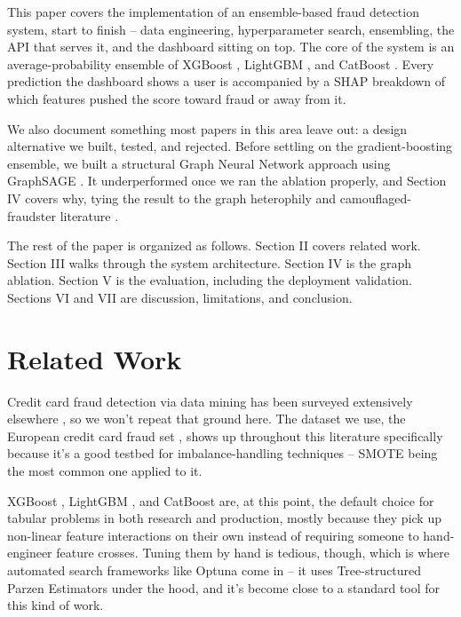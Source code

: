 \documentclass[conference]{IEEEtran}
\begin{document}
This paper covers the implementation of an ensemble-based fraud detection system, start to finish -- data engineering, hyperparameter search, ensembling, the API that serves it, and the dashboard sitting on top. The core of the system is an average-probability ensemble of XGBoost \cite{chen2016xgboost}, LightGBM \cite{ke2017lightgbm}, and CatBoost \cite{prokhorenkova2018catboost}. Every prediction the dashboard shows a user is accompanied by a SHAP \cite{lundberg2017unified} breakdown of which features pushed the score toward fraud or away from it.

We also document something most papers in this area leave out: a design alternative we built, tested, and rejected. Before settling on the gradient-boosting ensemble, we built a structural Graph Neural Network approach using GraphSAGE \cite{hamilton2017inductive}. It underperformed once we ran the ablation properly, and Section IV covers why, tying the result to the graph heterophily and camouflaged-fraudster literature \cite{zhu2020beyond, dou2020enhancing}.

The rest of the paper is organized as follows. Section II covers related work. Section III walks through the system architecture. Section IV is the graph ablation. Section V is the evaluation, including the deployment validation. Sections VI and VII are discussion, limitations, and conclusion.

\section{Related Work}
Credit card fraud detection via data mining has been surveyed extensively elsewhere \cite{abdallah2016fraud, phua2010comprehensive}, so we won't repeat that ground here. The dataset we use, the European credit card fraud set \cite{dalpozzolo2015calibrating}, shows up throughout this literature specifically because it's a good testbed for imbalance-handling techniques -- SMOTE \cite{macia2011smote} being the most common one applied to it.

XGBoost \cite{chen2016xgboost}, LightGBM \cite{ke2017lightgbm}, and CatBoost \cite{prokhorenkova2018catboost} are, at this point, the default choice for tabular problems in both research and production, mostly because they pick up non-linear feature interactions on their own instead of requiring someone to hand-engineer feature crosses. Tuning them by hand is tedious, though, which is where automated search frameworks like Optuna \cite{akiba2019optuna} come in -- it uses Tree-structured Parzen Estimators \cite{bergstra2011algorithms} under the hood, and it's become close to a standard tool for this kind of work.
\end{document}
